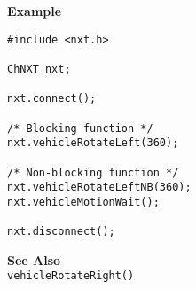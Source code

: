\noindent
{\bf Example}
\begin{verbatim}
#include <nxt.h>

ChNXT nxt;

nxt.connect();

/* Blocking function */
nxt.vehicleRotateLeft(360);

/* Non-blocking function */
nxt.vehicleRotateLeftNB(360);
nxt.vehicleMotionWait();

nxt.disconnect();
\end{verbatim}

\noindent
{\bf See Also}\\
\texttt{vehicleRotateRight()}

